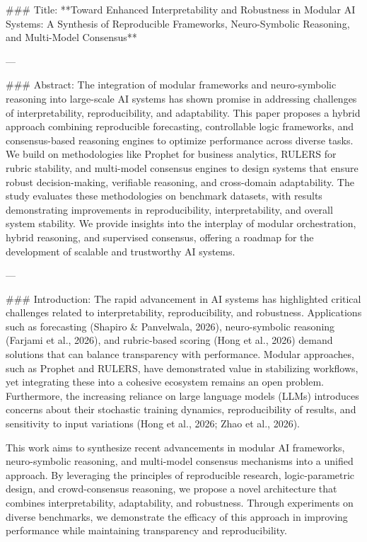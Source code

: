 ### Title:
**Toward Enhanced Interpretability and Robustness in Modular AI Systems: A Synthesis of Reproducible Frameworks, Neuro-Symbolic Reasoning, and Multi-Model Consensus**

---

### Abstract:
The integration of modular frameworks and neuro-symbolic reasoning into large-scale AI systems has shown promise in addressing challenges of interpretability, reproducibility, and adaptability. This paper proposes a hybrid approach combining reproducible forecasting, controllable logic frameworks, and consensus-based reasoning engines to optimize performance across diverse tasks. We build on methodologies like Prophet for business analytics, RULERS for rubric stability, and multi-model consensus engines to design systems that ensure robust decision-making, verifiable reasoning, and cross-domain adaptability. The study evaluates these methodologies on benchmark datasets, with results demonstrating improvements in reproducibility, interpretability, and overall system stability. We provide insights into the interplay of modular orchestration, hybrid reasoning, and supervised consensus, offering a roadmap for the development of scalable and trustworthy AI systems.

---

### Introduction:
The rapid advancement in AI systems has highlighted critical challenges related to interpretability, reproducibility, and robustness. Applications such as forecasting (Shapiro & Panvelwala, 2026), neuro-symbolic reasoning (Farjami et al., 2026), and rubric-based scoring (Hong et al., 2026) demand solutions that can balance transparency with performance. Modular approaches, such as Prophet and RULERS, have demonstrated value in stabilizing workflows, yet integrating these into a cohesive ecosystem remains an open problem. Furthermore, the increasing reliance on large language models (LLMs) introduces concerns about their stochastic training dynamics, reproducibility of results, and sensitivity to input variations (Hong et al., 2026; Zhao et al., 2026).

This work aims to synthesize recent advancements in modular AI frameworks, neuro-symbolic reasoning, and multi-model consensus mechanisms into a unified approach. By leveraging the principles of reproducible research, logic-parametric design, and crowd-consensus reasoning, we propose a novel architecture that combines interpretability, adaptability, and robustness. Through experiments on diverse benchmarks, we demonstrate the efficacy of this approach in improving performance while maintaining transparency and reproducibility.

